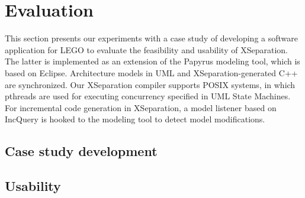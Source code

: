\section{Evaluation}
\label{sec:evaluation}
This section presents our experiments with a case study of developing a software application for LEGO to evaluate the feasibility and usability of XSeparation.
The latter is implemented as an extension of the Papyrus modeling tool, which is based on Eclipse.
Architecture models in UML and XSeparation-generated C++ are synchronized.
Our XSeparation compiler supports POSIX systems, in which pthreads are used for executing concurrency specified in UML State Machines.
For incremental code generation in XSeparation, a model listener based on IncQuery is hooked to the modeling tool to detect model modifications.


\subsection{Case study development}


\subsection{Usability}

